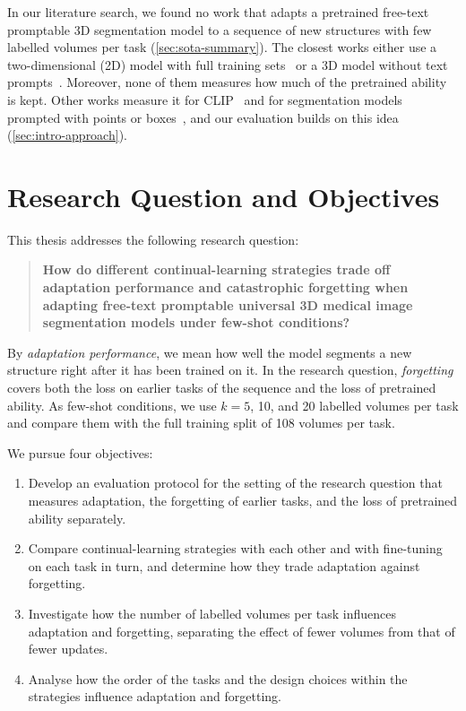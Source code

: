 In our literature search, we found no work that adapts a pretrained free-text promptable 3D segmentation model to a sequence of new structures with few labelled volumes per task (\cref{sec:sota-summary}).
The closest works either use a two-dimensional (2D) model with full training sets~\cite{gao2026medcrpcl,gao2025paewc,gao2026medpeftcl} or a 3D model without text prompts~\cite{chen2026fewshotcontinuallearning3d}.
Moreover, none of them measures how much of the pretrained ability is kept.
Other works measure it for CLIP~\cite{Zhang_2024_CVPR} and for segmentation models prompted with points or boxes~\cite{wang2025casam,wang2024sammed3dmoe}, and our evaluation builds on this idea (\cref{sec:intro-approach}).

\section{Research Question and Objectives}
\label{sec:intro-rq}

This thesis addresses the following research question:
\begin{quote}
\textbf{How do different continual-learning strategies trade off adaptation performance and catastrophic forgetting when adapting free-text promptable universal 3D medical image segmentation models under few-shot conditions?}
\end{quote}
By \emph{adaptation performance}, we mean how well the model segments a new structure right after it has been trained on it.
In the research question, \emph{forgetting} covers both the loss on earlier tasks of the sequence and the loss of pretrained ability.
As few-shot conditions, we use $k = 5$, 10, and 20 labelled volumes per task and compare them with the full training split of 108 volumes per task.

We pursue four objectives:
\begin{enumerate}
  \item Develop an evaluation protocol for the setting of the research question that measures adaptation, the forgetting of earlier tasks, and the loss of pretrained ability separately.
  \item Compare continual-learning strategies with each other and with fine-tuning on each task in turn, and determine how they trade adaptation against forgetting.
  \item Investigate how the number of labelled volumes per task influences adaptation and forgetting, separating the effect of fewer volumes from that of fewer updates.
  \item Analyse how the order of the tasks and the design choices within the strategies influence adaptation and forgetting.
\end{enumerate}

